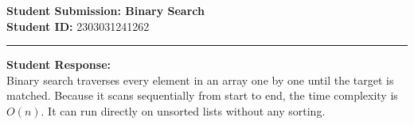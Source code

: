 \documentclass[11pt,a4paper]{article}
\begin{document}
\begin{center}
    {\large\bfseries Student Submission: Binary Search}\\[0.1cm]
    \textbf{Student ID:} 2303031241262
\end{center}
\hrule
\vspace{0.5cm}
\noindent\textbf{Student Response:}\\
Binary search traverses every element in an array one by one until the target is matched.
Because it scans sequentially from start to end, the time complexity is $O(n)$.
It can run directly on unsorted lists without any sorting.
\end{document}
